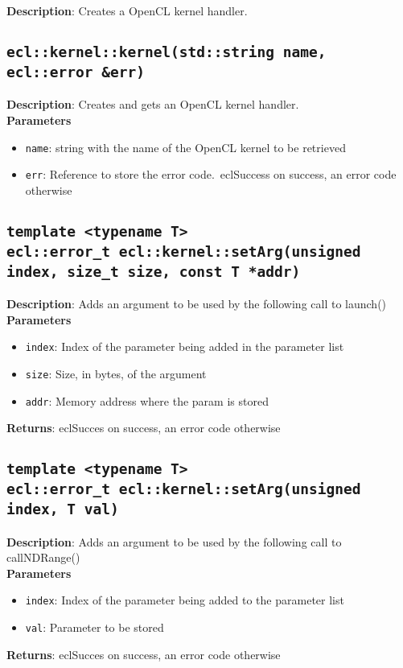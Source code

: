 \textbf{Description}: Creates a OpenCL kernel handler.

\subsection{\texttt{ecl::kernel::kernel(std::string name, ecl::error \&err)}}

\textbf{Description}: Creates and gets an OpenCL kernel handler. \\
\textbf{Parameters}
\begin{itemize}
  \item \texttt{name}: string with the name of the OpenCL kernel to be retrieved
  \item \texttt{err}: Reference to store the error code.\ eclSuccess on success, an error code
  otherwise
\end{itemize}

\subsection{\texttt{template <typename T>\\ecl::error\_t ecl::kernel::setArg(unsigned index, size\_t 
size, const T *addr)}}

\textbf{Description}: Adds an argument to be used by the following call to launch()\\
\textbf{Parameters}
\begin{itemize}
  \item \texttt{index}: Index of the parameter being added in the parameter list
  \item \texttt{size}: Size, in bytes, of the argument
  \item \texttt{addr}: Memory address where the param is stored
\end{itemize}
\textbf{Returns}: eclSucces on success, an error code otherwise

\subsection{\texttt{template <typename T>\\ecl::error\_t ecl::kernel::setArg(unsigned index, T 
val)}}

\textbf{Description}: Adds an argument to be used by the following call to callNDRange()\\
\textbf{Parameters}
\begin{itemize}
  \item \texttt{index}: Index of the parameter being added to the parameter list
  \item \texttt{val}: Parameter to be stored
\end{itemize}
\textbf{Returns}: eclSucces on success, an error code otherwise

